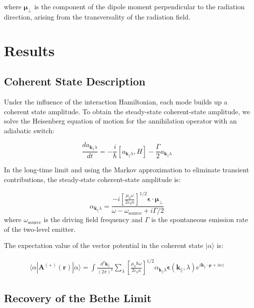 \documentclass[%
 reprint,
 amsmath,amssymb,
 aps,
 floatfix,
]{revtex4-2}
\begin{document}
where $\boldsymbol{\mu}_\perp$ is the component of the dipole moment perpendicular to the radiation direction, arising from the transversality of the radiation field.

\section{Results}

\subsection{Coherent State Description}

Under the influence of the interaction Hamiltonian, each mode builds up a coherent state amplitude. To obtain the steady-state coherent-state amplitude, we solve the Heisenberg equation of motion for the annihilation operator with an adiabatic switch:

\begin{equation}
\frac{da_{\mathbf{k}_\parallel\lambda}}{dt} = -\frac{i}{\hbar}[a_{\mathbf{k}_\parallel\lambda}, H] - \frac{\Gamma}{2}a_{\mathbf{k}_\parallel\lambda}
\end{equation}

In the long-time limit and using the Markov approximation to eliminate transient contributions, the steady-state coherent-state amplitude is:

\begin{equation}
\alpha_{\mathbf{k}_\parallel\lambda} = \frac{-i\left[\frac{\mu_0\omega}{2\varepsilon_0\kappa}\right]^{1/2}\boldsymbol{\epsilon}\cdot\boldsymbol{\mu}_\perp}{\omega - \omega_{\text{source}} + i\Gamma/2}
\end{equation}
where $\omega_{\text{source}}$ is the driving field frequency and $\Gamma$ is the spontaneous emission rate of the two-level emitter.

The expectation value of the vector potential in the coherent state $|\alpha\rangle$ is:

\begin{align}
\langle\alpha|\mathbf{A}^{(+)}(\mathbf{r})|\alpha\rangle = \int\frac{d^2\mathbf{k}_\parallel}{(2\pi)^2}
\sum_\lambda\left[\frac{\mu_0\hbar\omega}{2\varepsilon_0\kappa}\right]^{1/2}
\alpha_{\mathbf{k}_\parallel\lambda}\boldsymbol{\epsilon}(\mathbf{k}_\parallel,\lambda)
e^{i\mathbf{k}_\parallel\cdot\boldsymbol{\rho}+i\kappa z}
\end{align}

\subsection{Recovery of the Bethe Limit}
\end{document}
